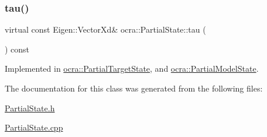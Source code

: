 \subsubsection{\texorpdfstring{tau()}{tau()}}
{\footnotesize\ttfamily virtual const Eigen\+::\+Vector\+Xd\& ocra\+::\+Partial\+State\+::tau (\begin{DoxyParamCaption}{ }\end{DoxyParamCaption}) const\hspace{0.3cm}{\ttfamily [pure virtual]}}



Implemented in \hyperlink{classocra_1_1PartialTargetState_ac76855da54cf77b63bdbd7ecdb6ef57d}{ocra\+::\+Partial\+Target\+State}, and \hyperlink{classocra_1_1PartialModelState_a286258284aa61c902106a6b0fcdde9ca}{ocra\+::\+Partial\+Model\+State}.



The documentation for this class was generated from the following files\+:\begin{DoxyCompactItemize}
\item 
\hyperlink{PartialState_8h}{Partial\+State.\+h}\item 
\hyperlink{PartialState_8cpp}{Partial\+State.\+cpp}\end{DoxyCompactItemize}
